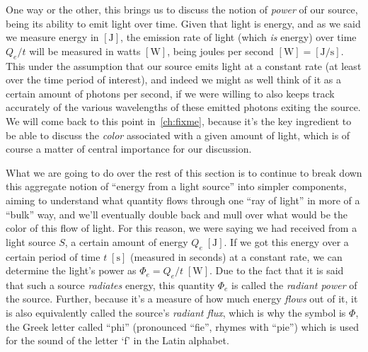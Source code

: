 One way or the other, this brings us to discuss the notion of \textsl{power} of our source, 
being its ability to emit light over time. 
Given that light is energy, and as we said we measure energy in $[\unit\joule]$, the emission 
rate of light (which \emph{is} energy) over time $Q_e/t$ will be measured in 
watts $[\unit\watt]$, being joules per second $[\unit\watt] = [\unit{\joule\per\second}]$. 
This under the assumption that our source emits light at a constant rate (at least over the
time period of interest), and indeed we might as well think of it as a certain amount of photons 
per second, if we were willing to also keeps track accurately of the various wavelengths of these 
emitted photons exiting the source.
We will come back to this point in~\cref{ch:fixme}, because it's the key ingredient to be able to
discuss the \emph{\gls{color}} associated with a given amount of light, which is of course a 
matter of central importance for our discussion.

What we are going to do over the rest of this section is to continue to break down 
this aggregate notion of ``energy from a light source'' into simpler components, aiming 
to understand what quantity flows through one ``ray of light'' in more of a ``bulk'' way,
and we'll eventually double back and mull over what would be the \gls{color} of this flow of light.
For this reason, we were saying we had received from a light source $S$, a certain amount
of energy $Q_e\;[\unit\joule]$. 
If we got this energy over a certain period of time 
$t\;[\unit\second]$ (measured in seconds) at a constant rate, 
we can determine the light's power as $\Phi_e = Q_e / t\;[\unit\watt]$.
Due to the fact that it is said that such a source \textsl{radiates} energy, this quantity
$\Phi_e$ is called the \textsl{radiant power} of the source. 
Further, because it's a measure of how much energy \textsl{flows} out of it, it is also equivalently
called the source's \textsl{radiant flux}, which is why the symbol is $\Phi$, 
the Greek letter called ``phi'' (pronounced ``fie'', rhymes with ``pie'') which is used for the sound
of the letter `f' in the Latin alphabet.

